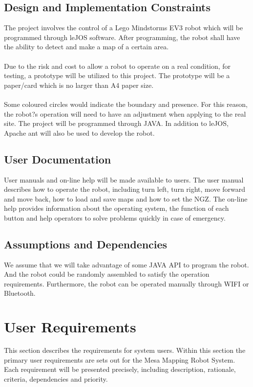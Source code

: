 \documentclass[11pt, a4paper]{article}
\begin{document}
\subsection{Design and Implementation Constraints}
The project involves the control of a Lego Mindstorms EV3 robot which will be programmed through leJOS software. After programming, the robot shall have the ability to detect and make a map of a certain area. \\
\\
Due to the risk and cost to allow a robot to operate on a real condition, for testing, a prototype will be utilized to this project. The prototype will be a paper/card which is no larger than A4 paper size.\\
\\
Some coloured circles would indicate the boundary and presence. For this reason, the robot?s operation will need to have an adjustment when applying to the real site.
The project will be programmed through JAVA. In addition to leJOS, Apache ant will also be used to develop the robot.

\subsection{User Documentation}
User manuals and on-line help will be made available to users. The user manual describes how to operate the robot, including turn left, turn right, move forward and move back, how to load and save maps and how to set the NGZ. The on-line help provides information about the operating system, the function of each button and help operators to solve problems quickly in case of emergency. 

\subsection{Assumptions and Dependencies}
We assume that we will take advantage of some JAVA API to program the robot. And the robot could be randomly assembled to satisfy the operation requirements. Furthermore, the robot can be operated manually through WIFI or Bluetooth.



\section{User Requirements}
This section describes the requirements for system users. Within this section the primary user requirements are sets out for the Mesa Mapping Robot System. Each requirement will be presented precisely, including description, rationale, criteria, dependencies and priority. 
\end{document}
